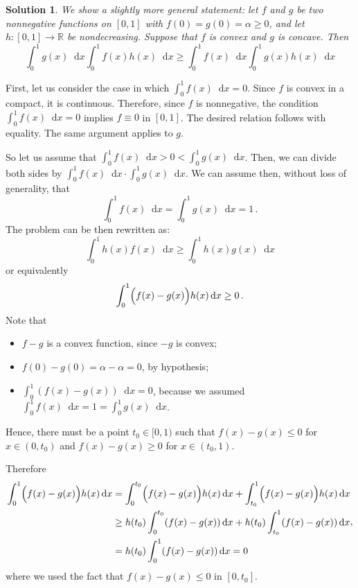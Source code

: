 \documentclass[reqno]{amsart}
\theoremstyle{definition}
\newtheorem*{solution}{Solution}
\newcommand*\diff{\mathop{}\!\mathrm{d}}
\begin{document}
\begin{solution}
\textit{\noindent
We show a slightly more general statement: 
let $f$ and $g$ be two nonnegative functions on $[0,1]$ with $f(0)=g(0)=\alpha\ge0
$,
and let $h\colon [0,1] \to \mathbb{R}$ be nondecreasing. Suppose that $f$ is convex and $g$ is concave. Then
\[
\int_0^1 g(x) \diff x \int_0^1 f(x)h(x) \diff x \ge \int_0^1 f(x) \diff x 
\int_0^1 g(x)h(x) \diff x 
\]
}


First, let us consider the case in which $\int_0^1 f(x) \diff x = 0$.
Since $f$ is convex in a compact, it is continuous. Therefore, since $f$ is nonnegative, the condition $\int_0^1 f(x) \diff x = 0$ implies $f \equiv 0$ in $[0,1]$. The desired relation follows with equality.
The same argument applies to $g$.

So let us assume that $\int_0^1 f(x) \diff x > 0 < \int_0^1 g(x) \diff x$. Then, we can divide both sides by $
\int_0^1 f(x) \diff x \cdot \int_0^1 g(x) \diff x $. We can assume then, without loss of generality, that
\[
    \int_0^1 f(x) \diff x = \int_0^1 g(x) \diff x = 1\, .
\]
The problem can be then rewritten as:
\[
    \int_0^1 h(x) f(x) \diff x \ge \int_0^1 h(x) g(x) \diff x\]
    or equivalently 
    \[\int_0^1 \Bigl(f(x)-g(x)\Bigr)h(x) \diff x \ge 0 \, .
\]
Note that
\begin{itemize}
    \item $f-g$ is a convex function, since $-g$ is convex;
    \item $f(0)-g(0)=\alpha-\alpha=0$, by hypothesis;
    \item  $\int_0^1 (f(x)-g(x)) \diff x = 0$, because we assumed $\int_0^1 f(x) \diff x = 1 = \int_0^1 g(x) \diff x $.
\end{itemize}
Hence, there must be a point $t_0\in [0,1)$ such that $f(x)-g(x) \le 0$ for $x\in (0,t_0)$ and $f(x)-g(x) \ge 0$ for $x\in (t_0,1)$.

Therefore
\[
\begin{split}
    \int_0^1 \Bigl(f(x)-g(x)\Bigr)h(x) \diff x 
    &= \int_0^{t_0} \Bigl(f(x)-g(x)\Bigr)h(x) \diff x  + \int_{t_0}^1 \Bigl(f(x)-g(x)\Bigr)h(x) \diff x  \\
    &\ge h(t_0)\int_0^{t_0} (f(x)-g(x))\diff x +h(t_0)\int_{t_0}^1 (f(x)-g(x))\diff x \\
    &= h(t_0)\int_0^{1} (f(x)-g(x))\diff x = 0       
\end{split},
\]
where we used the fact that $f(x)-g(x) \le 0$ in $[0,t_0]$.

\end{solution}
\end{document}
